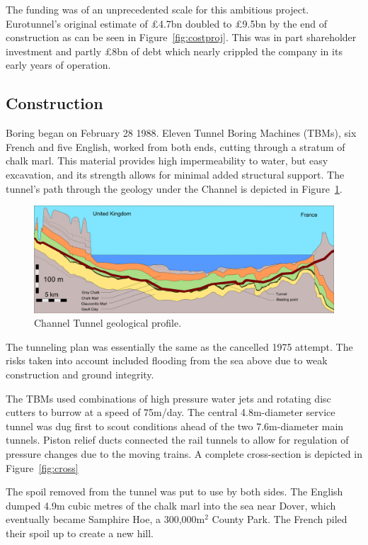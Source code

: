 \documentclass[12pt]{article} %
\begin{document}
The funding  was of an unprecedented scale for this ambitious project. Eurotunnel's original estimate of £4.7bn doubled to £9.5bn by the end of construction as can be seen in Figure~\ref{fig:costproj}.\cite{costeval} This was in part shareholder investment and partly £8bn of debt which nearly crippled the company in its early years of operation.

\subsection{Construction}
Boring began on February 28 1988. Eleven Tunnel Boring Machines (TBMs), six French and five English, worked from both ends, cutting through a stratum of chalk marl. This material provides high impermeability to water, but easy excavation, and its strength allows for minimal added structural support. The tunnel's path through the geology under the Channel is depicted in Figure~\ref{fig:geo}.

\begin{figure}[tp]
  \centering
  \includegraphics[width=\textwidth]{geology}
  \caption{Channel Tunnel geological profile.}
  \label{fig:geo}
\end{figure}

The tunneling plan was essentially the same as the cancelled 1975 attempt. The risks taken into account included flooding from the sea above due to weak construction and ground integrity.

The TBMs used combinations of high pressure water jets and rotating disc cutters to burrow at a speed of 75m/day. The central 4.8m-diameter service tunnel was dug first to scout conditions ahead of the two 7.6m-diameter main tunnels. Piston relief ducts connected the rail tunnels to allow for regulation of pressure changes due to the moving trains. A complete cross-section is depicted in Figure~\ref{fig:cross}

The spoil removed from the tunnel was put to use by both sides. The English dumped 4.9m cubic metres of the chalk marl into the sea near Dover, which eventually became Samphire Hoe, a 300,000m$^2$ County Park.\cite{samphoe} The French piled their spoil up to create a new hill.
\end{document}
